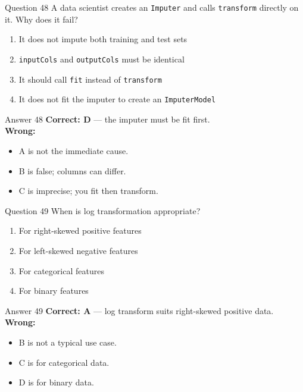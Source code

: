 \documentclass[aspectratio=169,11pt]{beamer}
\begin{document}
	\begin{frame}{Question 48}
		A data scientist creates an \texttt{Imputer} and calls \texttt{transform} directly on it. Why does it fail?
		\begin{enumerate}[label=\Alph*.]
			\item It does not impute both training and test sets
			\item \texttt{inputCols} and \texttt{outputCols} must be identical
			\item It should call \texttt{fit} instead of \texttt{transform}
			\item It does not fit the imputer to create an \texttt{ImputerModel}
		\end{enumerate}
	\end{frame}
	\begin{frame}{Answer 48}
		\textbf{Correct: D} --- the imputer must be fit first.\\
		\vspace{0.5em}
		\textbf{Wrong:}
		\begin{itemize}
			\item A is not the immediate cause.
			\item B is false; columns can differ.
			\item C is imprecise; you fit then transform.
		\end{itemize}
	\end{frame}
	
	\begin{frame}{Question 49}
		When is log transformation appropriate?
		\begin{enumerate}[label=\Alph*.]
			\item For right-skewed positive features
			\item For left-skewed negative features
			\item For categorical features
			\item For binary features
		\end{enumerate}
	\end{frame}
	\begin{frame}{Answer 49}
		\textbf{Correct: A} --- log transform suits right-skewed positive data.\\
		\vspace{0.5em}
		\textbf{Wrong:}
		\begin{itemize}
			\item B is not a typical use case.
			\item C is for categorical data.
			\item D is for binary data.
		\end{itemize}
	\end{frame}
	
\end{document}
